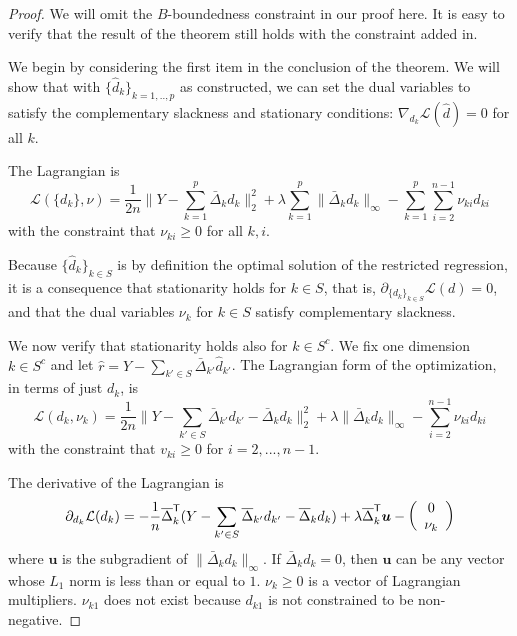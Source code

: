 \begin{proof} 
We will omit the $B$-boundedness constraint in our proof here. It is easy to verify that the result of the theorem still holds with the constraint added in.

We begin by considering the first item in the conclusion of the theorem.
We will show that with $\{\hat{d}_k\}_{k=1,..,p}$ as constructed, we
can set the dual variables to satisfy the 
complementary slackness and stationary conditions: $\nabla_{d_k} \mathcal{L}(\hat{d})  = 0$ for all $k$. 

The Lagrangian is
\begin{equation}
\label{eqn:full_lagrange}
\mathcal{L}( \{ d_k \}, \nu) = 
  \frac{1}{2n} \Big\| 
    Y - \sum_{k=1}^p  \bar{\Delta}_k d_k  \Big\|_2^2 + 
    \lambda \sum_{k=1}^p \| \bar{\Delta}_k d_k \|_\infty -
    \sum_{k=1}^p \sum_{i=2}^{n-1} \nu_{ki} d_{ki} 
\end{equation}
with the constraint that $\nu_{ki} \geq 0$ for all $k,i$.

Because $\{\hat{d}_k\}_{k \in S}$ is by definition the optimal solution of the restricted regression, it is a consequence that stationarity holds for $k \in S$, that is, $\partial_{ \{ d_k \}_{k \in S} } \mathcal{L}(d) = 0$, and that the dual variables $\nu_k$ for $k \in S$ satisfy complementary slackness.

We now verify that stationarity holds also for $k \in S^c$. We fix one dimension $k \in S^c$ and let $\hat{r} = Y - \sum_{k' \in S} \bar{\Delta}_{k'} \hat{d}_{k'}$. 
The Lagrangian form of the optimization, in terms of just $d_k$, is
\[
\mathcal{L}(d_k, \nu_k) =
  \frac{1}{2n} \big\| Y - \sum_{k' \in S} \bar{\Delta}_{k'} d_{k'} 
  -  \bar{\Delta}_k d_k \big\|_2^2 
   + \lambda \| \bar{\Delta}_k d_k\|_\infty
  - \sum_{i=2}^{n-1} \nu_{ki} d_{ki}
\]
with the constraint that $v_{ki} \geq 0$ for $i=2,...,n-1$. 

The derivative of the Lagrangian is
\begin{align*}
\partial_{d_k} \mathcal{L}(d_k) =  -\frac{1}{n} \overline{\Delta}_k^{\mathsf{T}} ( Y - \sum_{k'\in S} \overline{\Delta}_{k'} d_{k'}  - \overline{\Delta}_k d_k )
        + \lambda \overline{\Delta}_k^{\mathsf{T}} \mbox{\boldmath $u$}
      - \left( \begin{array}{c} 0 \\ \nu_k \end{array} \right)
\end{align*}
where $\mathbf{u}$ is the subgradient of $\| \bar{\Delta}_k d_k \|_\infty$. If $\bar{\Delta}_k d_k = 0$, then $\mathbf{u}$ can be any vector whose $L_1$ norm is less than or equal to $1$. $\nu_k \geq 0$ is a vector of Lagrangian multipliers. $\nu_{k1}$ does not exist because $d_{k1}$ is not constrained to be non-negative.


\end{proof}
